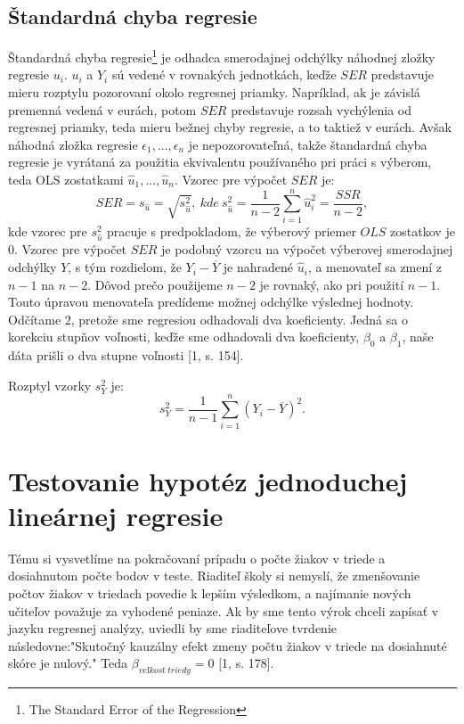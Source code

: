\documentclass[]{tukediphc}
\begin{document}
\subsection{Štandardná chyba regresie}

Štandardná chyba regresie\footnote{The Standard Error of the Regression} je odhadca smerodajnej odchýlky náhodnej zložky regresie $u_i$. $u_i$ a $Y_i$ sú vedené v rovnakých jednotkách, keďže $SER$ predstavuje mieru rozptylu pozorovaní okolo regresnej priamky. Napríklad, ak je závislá premenná vedená v eurách, potom $SER$ predstavuje rozsah vychýlenia od regresnej priamky, teda mieru bežnej chyby regresie, a to taktiež v eurách. Avšak náhodná zložka regresie $\epsilon_1, ..., \epsilon_n$ je nepozorovateľná, takže štandardná chyba regresie je vyrátaná za použitia ekvivalentu používaného pri práci s výberom, teda OLS zostatkami $\hat{u}_{1}, ..., \hat{u}_{n}$. Vzorec pre výpočet $SER$ je:
\begin{equation}
    SER = s_{\hat{u}} = \sqrt{s_{\hat{u}}^2}, \ kde \ s_{\hat{u}}^2 = \frac{1}{n-2}\sum_{i=1}^{n}\hat{u}_{i}^2 = \frac{SSR}{n-2},
\end{equation}
kde vzorec pre $s_{\hat{u}}^2$ pracuje s predpokladom, že výberový priemer $OLS$ zostatkov je $0$. Vzorec pre výpočet $SER$ je podobný vzorcu na výpočet výberovej smerodajnej odchýlky $Y$, s tým rozdielom, že $Y_i - \overline{Y}$ je nahradené $\hat{u}_{i}$, a menovateľ sa zmení z $n - 1$ na $n - 2$. Dôvod prečo použijeme $n - 2$ je rovnaký, ako pri použití $n - 1$. Touto úpravou menovateľa predídeme možnej odchýlke výslednej hodnoty. Odčítame $2$, pretože sme regresiou odhadovali dva koeficienty. Jedná sa o korekciu stupňov voľnosti, keďže sme odhadovali dva koeficienty, $\beta_0$  a $\beta_1$, naše dáta prišli o dva stupne voľnosti [1, s. 154].  

Rozptyl vzorky $s^2_{Y}$ je:
\begin{equation}
    s^2_{Y} = \frac{1}{n - 1}\sum_{i=1}^{n}(Y_i - \overline{Y})^2.
\end{equation}

\newpage
\section{Testovanie hypotéz jednoduchej lineárnej regresie}

Tému si vysvetlíme na pokračovaní prípadu o počte žiakov v triede a dosiahnutom počte bodov v teste. Riaditeľ školy si nemyslí, že zmenšovanie počtov žiakov v triedach povedie k lepším výsledkom, a najímanie nových učiteľov považuje za vyhodené peniaze. Ak by sme tento výrok chceli zapísať v jazyku regresnej analýzy, uviedli by sme riaditeľove tvrdenie následovne:"Skutočný kauzálny efekt zmeny počtu žiakov v triede na dosiahnuté skóre je nulový." Teda $\beta_{veľkosť \ triedy} = 0$ [1, s. 178]. 
\end{document}
